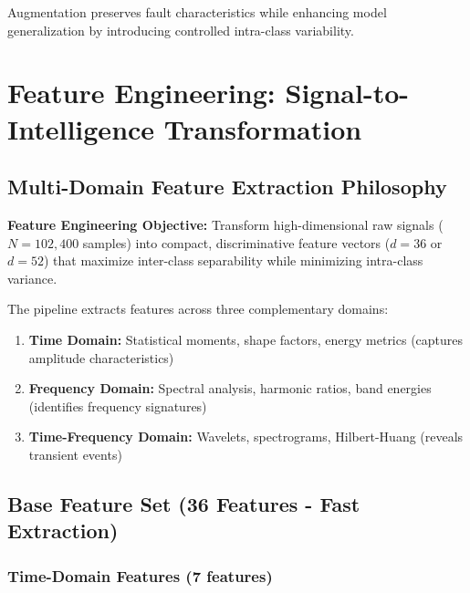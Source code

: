 \documentclass[11pt,a4paper]{article}
\begin{document}
Augmentation preserves fault characteristics while enhancing model generalization by introducing controlled intra-class variability.

\section{Feature Engineering: Signal-to-Intelligence Transformation}

\subsection{Multi-Domain Feature Extraction Philosophy}

\begin{keypoint}
\textbf{Feature Engineering Objective:} Transform high-dimensional raw signals ($N = 102{,}400$ samples) into compact, discriminative feature vectors ($d = 36$ or $d = 52$) that maximize inter-class separability while minimizing intra-class variance.
\end{keypoint}

The pipeline extracts features across three complementary domains:

\begin{enumerate}[leftmargin=*, itemsep=0.2em]
    \item \textbf{Time Domain:} Statistical moments, shape factors, energy metrics (captures amplitude characteristics)
    \item \textbf{Frequency Domain:} Spectral analysis, harmonic ratios, band energies (identifies frequency signatures)
    \item \textbf{Time-Frequency Domain:} Wavelets, spectrograms, Hilbert-Huang (reveals transient events)
\end{enumerate}

\subsection{Base Feature Set (36 Features - Fast Extraction)}

\subsubsection{Time-Domain Features (7 features)}
\end{document}
